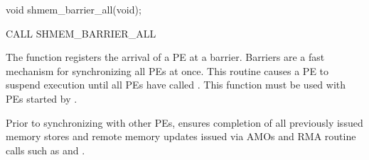 \synC   %

void shmem_barrier_all(void);%

\synF   %

CALL SHMEM_BARRIER_ALL%

{   
    The  function registers the arrival of a \ac{PE} at a
    barrier. Barriers are a fast mechanism for synchronizing all \ac{PE}s at
    once.  This routine causes a \ac{PE} to suspend execution until all \ac{PE}s have
    called .  This function must be used with \ac{PE}s started
    by .

    Prior to synchronizing with other \ac{PE}s,  ensures
    completion of all previously issued memory stores and remote
    memory updates issued via \openshmem{} \acp{AMO} and \ac{RMA} routine calls  such as  and .
}
{
}
\cbstart {} \cbend  	
\eAPI 
%
% 
% 
% 
% 
% 
% 
% 
% 
% 
% 
% 
% 
% 
% 
%        
